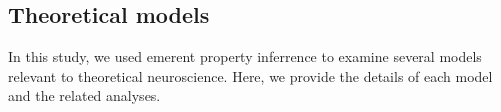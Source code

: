 \documentclass[11pt]{article}
\DeclareMathOperator*{\argmin}{argmin}
\DeclareMathOperator*{\argmax}{argmax}
\begin{document}



\subsection{Theoretical models}\label{methods_theoretical_models}
In this study, we used emerent property inferrence to examine several models relevant to theoretical neuroscience.  Here, we provide the details of each model  and the related analyses.
\end{document}
